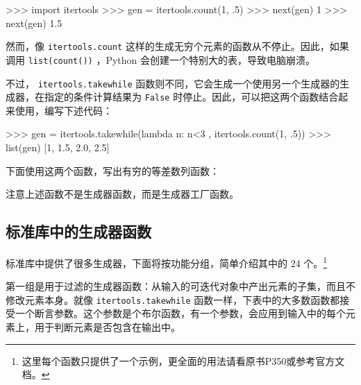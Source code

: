 \begin{python}
    >>> import itertools
    >>> gen = itertools.count(1, .5)
    >>> next(gen)
    1
    >>> next(gen)
    1.5
\end{python}

然而，像 \texttt{itertools.count} 这样的生成无穷个元素的函数从不停止。因此，如果调用 \texttt{list(count())} ，Python 会创建一个特别大的表，导致电脑崩溃。

不过， \texttt{itertools.takewhile} 函数则不同，它会生成一个使用另一个生成器的生成器，在指定的条件计算结果为 \texttt{False} 时停止。因此，可以把这两个函数结合起来使用，编写下述代码：

\begin{python}
    >>> gen = itertools.takewhile(lambda n: n<3 , itertools.count(1, .5))
    >>> list(gen)
    [1, 1.5, 2.0, 2.5]
\end{python}

下面使用这两个函数，写出有穷的等差数列函数：



注意上述函数不是生成器函数，而是生成器工厂函数。

\subsection{标准库中的生成器函数}

标准库中提供了很多生成器，下面将按功能分组，简单介绍其中的 24 个。\footnote{这里每个函数只提供了一个示例，更全面的用法请看原书P350或参考官方文档。}

第一组是用于过滤的生成器函数：从输入的可迭代对象中产出元素的子集，而且不修改元素本身。就像 \texttt{itertools.takewhile} 函数一样，下表中的大多数函数都接受一个断言参数。这个参数是个布尔函数，有一个参数，会应用到输入中的每个元素上，用于判断元素是否包含在输出中。

